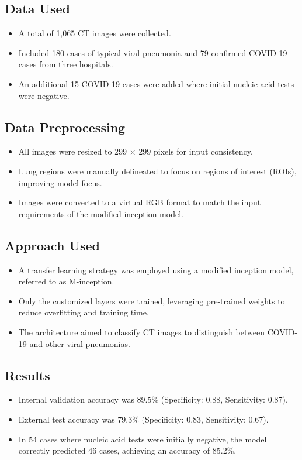 \subsection*{Data Used}
\begin{itemize}
    \item A total of 1,065 CT images were collected.
    \item Included 180 cases of typical viral pneumonia and 79 confirmed COVID-19 cases from three hospitals.
    \item An additional 15 COVID-19 cases were added where initial nucleic acid tests were negative.
\end{itemize}

\subsection*{Data Preprocessing}
\begin{itemize}
    \item All images were resized to 299 × 299 pixels for input consistency.
    \item Lung regions were manually delineated to focus on regions of interest (ROIs), improving model focus.
    \item Images were converted to a virtual RGB format to match the input requirements of the modified inception model.
\end{itemize}

\subsection*{Approach Used}
\begin{itemize}
    \item A transfer learning strategy was employed using a modified inception model, referred to as M-inception.
    \item Only the customized layers were trained, leveraging pre-trained weights to reduce overfitting and training time.
    \item The architecture aimed to classify CT images to distinguish between COVID-19 and other viral pneumonias.
\end{itemize}

\subsection*{Results}
\begin{itemize}
    \item Internal validation accuracy was 89.5\% (Specificity: 0.88, Sensitivity: 0.87).
    \item External test accuracy was 79.3\% (Specificity: 0.83, Sensitivity: 0.67).
    \item In 54 cases where nucleic acid tests were initially negative, the model correctly predicted 46 cases, achieving an accuracy of 85.2\%.
\end{itemize}

